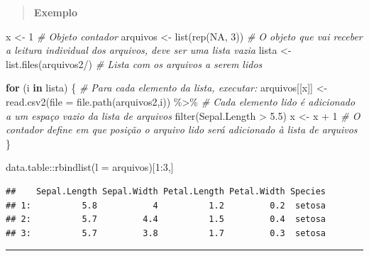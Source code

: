 \documentclass[
]{book}
\newenvironment{Shaded}{\begin{snugshade}}{\end{snugshade}}
\newcommand{\AttributeTok}[1]{\textcolor[rgb]{0.77,0.63,0.00}{#1}}
\newcommand{\CommentTok}[1]{\textcolor[rgb]{0.56,0.35,0.01}{\textit{#1}}}
\newcommand{\ConstantTok}[1]{\textcolor[rgb]{0.00,0.00,0.00}{#1}}
\newcommand{\ControlFlowTok}[1]{\textcolor[rgb]{0.13,0.29,0.53}{\textbf{#1}}}
\newcommand{\DecValTok}[1]{\textcolor[rgb]{0.00,0.00,0.81}{#1}}
\newcommand{\FloatTok}[1]{\textcolor[rgb]{0.00,0.00,0.81}{#1}}
\newcommand{\FunctionTok}[1]{\textcolor[rgb]{0.00,0.00,0.00}{#1}}
\newcommand{\NormalTok}[1]{#1}
\newcommand{\OtherTok}[1]{\textcolor[rgb]{0.56,0.35,0.01}{#1}}
\newcommand{\SpecialCharTok}[1]{\textcolor[rgb]{0.00,0.00,0.00}{#1}}
\newcommand{\StringTok}[1]{\textcolor[rgb]{0.31,0.60,0.02}{#1}}
\theoremstyle{definition}
\theoremstyle{definition}
\theoremstyle{definition}
\theoremstyle{definition}
\theoremstyle{remark}
\begin{document}
\begin{quote}
\textbf{Exemplo}
\end{quote}

\begin{Shaded}
\begin{Highlighting}[]
\NormalTok{x }\OtherTok{\textless{}{-}} \DecValTok{1}         \CommentTok{\# Objeto contador}
\NormalTok{arquivos }\OtherTok{\textless{}{-}} \FunctionTok{list}\NormalTok{(}\FunctionTok{rep}\NormalTok{(}\ConstantTok{NA}\NormalTok{, }\DecValTok{3}\NormalTok{)) }\CommentTok{\# O objeto que vai receber a leitura individual dos arquivos, deve ser uma lista vazia}
\NormalTok{lista }\OtherTok{\textless{}{-}} \FunctionTok{list.files}\NormalTok{(}\StringTok{\textquotesingle{}arquivos2/\textquotesingle{}}\NormalTok{) }\CommentTok{\# Lista com os arquivos a serem lidos}

\ControlFlowTok{for}\NormalTok{ (i }\ControlFlowTok{in}\NormalTok{ lista) \{      }\CommentTok{\# Para cada elemento da lista, executar:}
\NormalTok{  arquivos[[x]] }\OtherTok{\textless{}{-}} \FunctionTok{read.csv2}\NormalTok{(}\AttributeTok{file =} \FunctionTok{file.path}\NormalTok{(}\StringTok{\textquotesingle{}arquivos2\textquotesingle{}}\NormalTok{,i)) }\SpecialCharTok{\%\textgreater{}\%}  \CommentTok{\# Cada elemento lido é adicionado a um espaço vazio da lista de arquivos}
    \FunctionTok{filter}\NormalTok{(Sepal.Length }\SpecialCharTok{\textgreater{}} \FloatTok{5.5}\NormalTok{)}
\NormalTok{  x }\OtherTok{\textless{}{-}}\NormalTok{ x }\SpecialCharTok{+} \DecValTok{1}  \CommentTok{\# O contador define em que posição o arquivo lido será adicionado à lista de arquivos}
\NormalTok{\}}

\NormalTok{data.table}\SpecialCharTok{::}\FunctionTok{rbindlist}\NormalTok{(}\AttributeTok{l =}\NormalTok{ arquivos)[}\DecValTok{1}\SpecialCharTok{:}\DecValTok{3}\NormalTok{,]}
\end{Highlighting}
\end{Shaded}

\begin{verbatim}
##    Sepal.Length Sepal.Width Petal.Length Petal.Width Species
## 1:          5.8           4          1.2         0.2  setosa
## 2:          5.7         4.4          1.5         0.4  setosa
## 3:          5.7         3.8          1.7         0.3  setosa
\end{verbatim}

\begin{center}\rule{0.5\linewidth}{0.5pt}\end{center}
\end{document}
